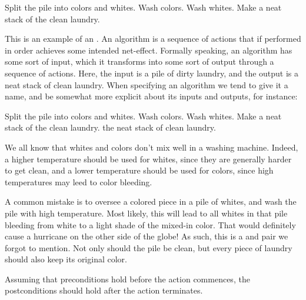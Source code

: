 \begin{codebox}
\li Split the pile into colors and whites.
\li Wash colors.
\li Wash whites.
\li Make a neat stack of the clean laundry.
\end{codebox}

This is an example of an . An algorithm is a sequence of actions
that if performed in order achieves some intended net-effect. Formally
speaking, an algorithm has some sort of input, which it transforms into some
sort of output through a sequence of actions. Here, the input is a pile of
dirty laundry, and the output is a neat stack of clean laundry. When specifying
an algorithm we tend to give it a name, and be somewhat more explicit about its
inputs and outputs, for instance:

\begin{codebox}
\li Split the pile into colors and whites.
\li Wash colors.
\li Wash whites.
\li Make a neat stack of the clean laundry.
\li \Return the neat stack of clean laundry.
\end{codebox}

We all know that whites and colors don't mix well in a washing machine. Indeed,
a higher temperature should be used for whites, since they are generally harder
to get clean, and a lower temperature should be used for colors, since high
temperatures may leed to color bleeding.

A common mistake is to oversee a colored piece in a pile of whites, and wash
the pile with high temperature.  Most likely, this will lead to all whites in
that pile bleeding from white to a light shade of the mixed-in color. That
would definitely cause a hurricane on the other side of the globe!  As such,
this is a  and  pair we forgot to mention. Not
only should the pile be clean, but every piece of laundry should also keep its
original color.

\begin{definition}

Assuming that preconditions hold before the action commences, the
postconditions should hold after the action terminates\footnotemark.


\end{definition}

